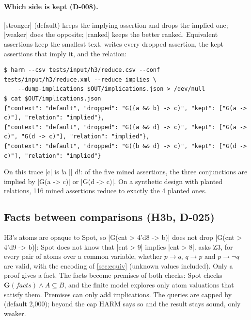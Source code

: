 \paragraph{Which side is kept (D-008).}  \code|stronger| (default) keeps the implying assertion and drops the implied one; \code|weaker| does the opposite; \code|ranked| keeps the better ranked. Equivalent assertions keep the smallest text.  writes every dropped assertion, the kept assertions that imply it, and the relation:

\begin{lstlisting}
$ harm --csv tests/input/h3/reduce.csv --conf tests/input/h3/reduce.xml --reduce implies \
    --dump-implications $OUT/implications.json > /dev/null
$ cat $OUT/implications.json
{"context": "default", "dropped": "G({a && b} -> c)", "kept": ["G(a -> c)"], "relation": "implied"},
{"context": "default", "dropped": "G({a && d} -> c)", "kept": ["G(a -> c)", "G(d -> c)"], "relation": "implied"},
{"context": "default", "dropped": "G({b && d} -> c)", "kept": ["G(d -> c)"], "relation": "implied"}
\end{lstlisting}
On this trace \code|c| is \code!a || d!: of the five mined assertions, the three conjunctions are implied by \code|G(a -> c)| or \code|G(d -> c)|. On a synthetic design with planted relations, 116 mined assertions reduce to exactly the 4 planted ones.

\subsection{Facts between comparisons (H3b, D-025)}\label{sec:premises}
H3's atoms are opaque to Spot, so \code|G(cnt > 4'd8 -> b)| does not drop \code|G(cnt > 4'd9 -> b)|: Spot does not know that \code|cnt > 9| implies \code|cnt > 8|.  asks Z3, for every pair of atoms over a common variable, whether $p \rightarrow q$, $q \rightarrow p$ and $p \rightarrow \neg q$ are valid, with the encoding of \cref{sec:equiv} (unknown values included). Only a proof gives a fact. The facts become premises of both checks: Spot checks $\mathbf{G}(\textit{facts}) \wedge A \subseteq B$, and the finite model explores only atom valuations that satisfy them. Premises can only add implications. The queries are capped by  (default 2{,}000); beyond the cap HARM says so and the result stays sound, only weaker.

